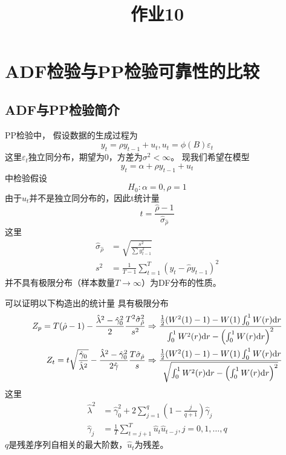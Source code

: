 \documentclass[cn]{homework}
\title{作业10}
\begin{document}
    \maketitle

    \section{ADF检验与PP检验可靠性的比较}

    \subsection{ADF与PP检验简介}
    PP检验中，
    假设数据的生成过程为
    \begin{equation}
        \label{eq:real process}
        y_t=\rho y_{t-1}+u_t,u_t=\phi(B)\varepsilon_t
    \end{equation}
    这里$\varepsilon_t$独立同分布，期望为0，方差为$\sigma^2<\infty$。
    现我们希望在模型
    \[y_t=\alpha+\rho y_{t-1}+u_t\]
    中检验假设
    \[H_0:\alpha=0,\rho=1\]
    由于$u_t$并不是独立同分布的，因此t统计量
    \[t=\frac{\hat\rho-1}{\hat\sigma_{\hat\rho}}\]
    这里
    \[\begin{aligned}
    \hat\sigma_{\hat\rho}&=\sqrt{\frac{s^2}{\sum y_{t-1}^2}}\\
    s^2&=\frac{1}{T-1}\sum_{t=1}^T(y_t-\hat\rho y_{t-1})^2
    \end{aligned}\]
    并不具有极限分布（样本数量$T\to\infty$）为DF分布的性质。

    可以证明以下构造出的统计量
    具有极限分布
    \begin{equation}
        \label{eq:pp lim dist}
        \begin{aligned}
        Z_p=T(\hat\rho-1)-\frac{\hat\lambda^2
        -\hat\gamma_0^2}{2}\frac{T^2\hat\sigma_{\hat\rho}^2}{s^2}
        \Rightarrow
        \frac{\frac{1}{2}(W^2(1)-1)-W(1)\int_0^1W(r)\diff r}%
        {\int_0^1W^2(r)\diff r-\left(\int_0^1W(r)\diff r\right)^2}\\
        Z_t=t\sqrt{\frac{\hat\gamma_0}{\hat\lambda^2}}
        -\frac{\hat\lambda^2-\hat\gamma_0^2}{2\hat\gamma}
        \frac{T\hat\sigma_{\hat\rho}}{s}
        \Rightarrow
        \frac{\frac{1}{2}(W^2(1)-1)-W(1)\int_0^1W(r)\diff r}%
        {\sqrt{\int_0^1W^2(r)\diff r-\left(\int_0^1W(r)\diff r\right)^2}}
        \end{aligned}
    \end{equation}
    这里
    \[\begin{aligned}
        \hat\lambda^2&=\hat\gamma_0^2
        +2\sum_{j=1}^q\left(1-\frac{j}{q+1}\right)\hat\gamma_j\\
        \hat\gamma_j&=\frac{1}{T}\sum_{t=j+1}^T\hat u_t\hat u_{t-j},j=0,1,\ldots,q
    \end{aligned}\]
    $q$是残差序列自相关的最大阶数，$\hat u_t$为残差。
\end{document}
